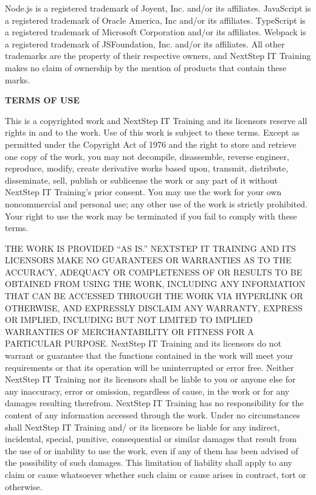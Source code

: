\documentclass[../workbook]{subfiles}
\begin{document}
{    %
    \par{
        Node.js is a registered trademark of Joyent, Inc. and/or its affiliates.
        JavaScript is a registered trademark of Oracle America, Inc and/or its affiliates.
        TypeScript is a registered trademark of Microsoft Corporation and/or its affiliates.
        Webpack is a registered trademark of JSFoundation, Inc. and/or its affiliates.
        All other trademarks are the property of their respective owners, and NextStep IT Training makes no claim of ownership by the mention of products that contain these marks.
    }

    \par{
        \textbf{TERMS OF USE}
    }

    \par{
        This is a copyrighted work and NextStep IT Training and its licensors reserve all rights in and to the work.
        Use of this work is subject to these terms.
        Except as permitted under the Copyright Act of 1976 and the right to store and retrieve one copy of the work, you may not decompile, disassemble, reverse engineer, reproduce, modify, create derivative works based upon, transmit, distribute, disseminate, sell, publish or sublicense the work or any part of it without NextStep IT Training's prior consent.
        You may use the work for your own noncommercial and personal use; any other use of the work is strictly prohibited.
        Your right to use the work may be terminated if you fail to comply with these terms.
    }

    \par{
        THE WORK IS PROVIDED “AS IS.”
        NEXTSTEP IT TRAINING AND ITS LICENSORS MAKE NO GUARANTEES OR WARRANTIES AS TO THE ACCURACY, ADEQUACY OR COMPLETENESS OF OR RESULTS TO BE OBTAINED FROM USING THE WORK, INCLUDING ANY INFORMATION THAT CAN BE ACCESSED THROUGH THE WORK VIA HYPERLINK OR OTHERWISE, AND EXPRESSLY DISCLAIM ANY WARRANTY, EXPRESS OR IMPLIED, INCLUDING BUT NOT LIMITED TO IMPLIED WARRANTIES OF MERCHANTABILITY OR FITNESS FOR A PARTICULAR PURPOSE.
        NextStep IT Training and its licensors do not warrant or guarantee that the functions contained in the work will meet your requirements or that its operation will be uninterrupted or error free. Neither NextStep IT Training nor its licensors shall be liable to you or anyone else for any inaccuracy, error or omission, regardless of cause, in the work or for any damages resulting therefrom.
        NextStep IT Training has no responsibility for the content of any information accessed through the work. Under no circumstances shall NextStep IT Training and/ or its licensors be liable for any indirect, incidental, special, punitive, consequential or similar damages that result from the use of or inability to use the work, even if any of them has been advised of the possibility of such damages.
        This limitation of liability shall apply to any claim or cause whatsoever whether such claim or cause arises in contract, tort or otherwise.
    }

}
\end{document}
